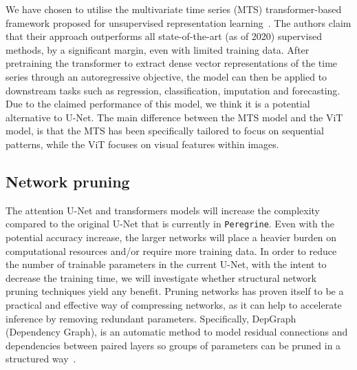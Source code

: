 We have chosen to utilise the multivariate time series (MTS) transformer-based framework proposed for unsupervised representation learning~\cite{Zerveas_2020_mvts}. The authors claim that their approach outperforms all state-of-the-art (as of 2020) supervised methods, by a significant margin, even with limited training data. After pretraining the transformer to extract dense vector representations of the time series through an autoregressive objective, the model can then be applied to downstream tasks such as regression, classification, imputation and forecasting. Due to the claimed performance of this model, we think it is a potential alternative to U-Net. The main difference between the MTS model and the ViT model, is that the MTS has been specifically tailored to focus on sequential patterns, while the ViT focuses on visual features within images.

\subsection{Network pruning}

The attention U-Net and transformers models will increase the complexity compared to the original U-Net that is currently in \texttt{Peregrine}. Even with the potential accuracy increase, the larger networks will place a heavier burden on computational resources and/or require more training data. In order to reduce the number of trainable parameters in the current U-Net, with the intent to decrease the training time, we will investigate whether structural network pruning techniques yield any benefit. Pruning networks has proven itself to be a practical and effective way of compressing networks, as it can help to accelerate inference by removing redundant parameters. Specifically, DepGraph (Dependency Graph), is an automatic method to model residual connections and dependencies between paired layers so groups of parameters can be pruned in a structured way~\cite{Fang_Ma_Song_Mi_Wang_2023}.
